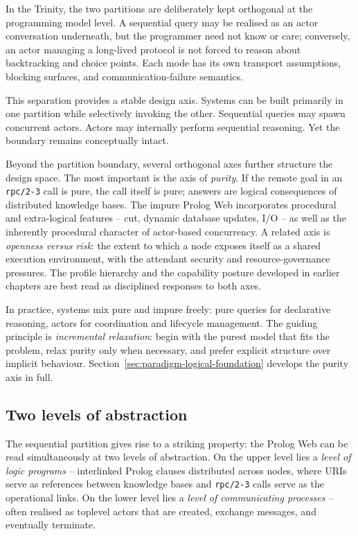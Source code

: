 In the Trinity, the two partitions are deliberately kept orthogonal at the programming model level. A sequential query may be realised as an actor conversation underneath, but the programmer need not know or care; conversely, an actor managing a long-lived protocol is not forced to reason about backtracking and choice points. Each mode has its own transport assumptions, blocking surfaces, and communication-failure semantics.

This separation provides a stable design axis. Systems can be built
primarily in one partition while selectively invoking the other.
Sequential queries may spawn concurrent actors. Actors may internally
perform sequential reasoning. Yet the boundary remains conceptually
intact.

Beyond the partition boundary, several orthogonal axes further structure
the design space. The most important is the axis of \emph{purity}. If
the remote goal in an \texttt{rpc/2-3} call is pure, the call itself is
pure; answers are logical consequences of distributed knowledge bases.
The impure Prolog Web incorporates procedural and extra-logical features
-- cut, dynamic database updates, I/O -- as well as the inherently
procedural character of actor-based concurrency. A related axis is
\emph{openness versus risk}: the extent to which a node exposes itself
as a shared execution environment, with the attendant security and
resource-governance pressures. The profile hierarchy and the capability
posture developed in earlier chapters are best read as disciplined
responses to both axes.

In practice, systems mix pure and impure freely: pure queries for declarative reasoning, actors for coordination and lifecycle management. The guiding principle is \emph{incremental relaxation}:
begin with the purest model that fits the problem, relax purity only
when necessary, and prefer explicit structure over implicit behaviour.
Section~\ref{sec:paradigm-logical-foundation} develops the purity axis
in full.


\subsection{Two levels of abstraction}\label{sec:paradigm-two-levels}

The sequential partition gives rise to a striking property: the Prolog
Web can be read simultaneously at two levels of abstraction. On the
upper level lies a \emph{level of logic programs} -- interlinked Prolog
clauses distributed across nodes, where URIs serve as references between
knowledge bases and \texttt{rpc/2-3} calls serve as the operational
links. On the lower level lies a \emph{level of communicating processes}
-- often realised as toplevel actors that are created, exchange messages,
and eventually terminate.

